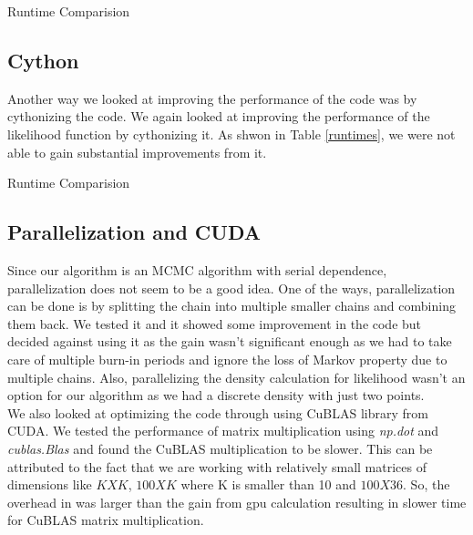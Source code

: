 \documentclass{article}
\begin{document}
\begin{table}[H]
\centering
\caption{Runtime Comparision \label{llcomp}}


\end{table}

\subsection{Cython}
Another way we looked at improving the performance of the code was by cythonizing the code. We again looked at improving the performance of the likelihood function by cythonizing it. As shwon in Table \ref{runtimes}, we were not able to gain substantial improvements from it.\\
\begin{table}[ht]
\centering
\caption{Runtime Comparision \label{runtimes}}

\end{table}


\subsection{Parallelization and CUDA}
Since our algorithm is an MCMC algorithm with serial dependence, parallelization does not seem to be a good idea. One of the ways, parallelization can be done is by splitting the chain into multiple smaller chains and combining them back. We tested it and it showed some improvement in the code but decided against using it as the gain wasn't significant enough as we had to take care of multiple burn-in periods and ignore the loss of Markov property due to multiple chains. Also, parallelizing the density calculation for likelihood wasn't an option for our algorithm as we had a discrete density with just two points.\\

We also looked at optimizing the code through using CuBLAS library from CUDA. We tested the performance of matrix multiplication using \textit{np.dot} and \textit{cublas.Blas} and found the CuBLAS multiplication to be slower. This can be attributed to the fact that we are working with relatively small matrices of dimensions like $KXK$, $100XK$ where K is smaller than 10 and  $100X36$. So, the overhead in was larger than the gain from gpu calculation resulting in slower time for CuBLAS matrix multiplication.
\end{document}
